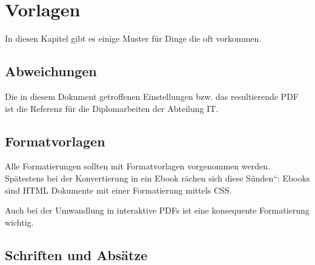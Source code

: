 
\section{Vorlagen}

In diesen Kapitel gibt es einige Muster für Dinge die oft vorkommen.

\subsection{Abweichungen}

Die in diesem Dokument getroffenen Einstellungen bzw. das resultierende PDF ist die
Referenz für die Diplomarbeiten der Abteilung IT.


\subsection{Formatvorlagen}

Alle Formatierungen sollten mit Formatvorlagen vorgenommen werden.
Spätestens bei der Konvertierung in ein Ebook rächen sich diese \quotedblbase Sünden``:
Ebooks sind HTML Dokumente mit einer Formatierung mittels CSS.

Auch bei der Umwandlung in interaktive PDFs ist eine konsequente Formatierung
wichtig.


\subsection{Schriften und Absätze}

